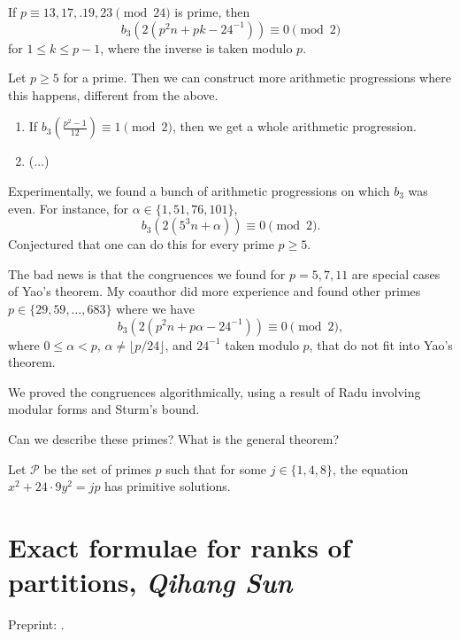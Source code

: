 \documentclass[reqno]{amsart} 
\begin{document}
\begin{theorem}
  If $p \equiv 13, 17,. 19, 23 \pmod{24}$ is prime, then
  \begin{equation*}
    b_3 \left( 2(p^2 n +  pk - 24^{-1}) \right) \equiv 0 \pmod{2}
  \end{equation*}
  for $1 \leq k \leq p - 1$, where the inverse is taken modulo $p$.
\end{theorem}
\begin{theorem}[Yao 2022]
  Let $p \geq 5$ for a prime.  Then we can construct more arithmetic progressions where this happens, different from the above.
  \begin{enumerate}
  \item If $b_3 \left( \frac{p^2 - 1}{12} \right) \equiv 1 \pmod{2}$, then we get a whole arithmetic progression.
  \item (...)
  \end{enumerate}
\end{theorem}

Experimentally, we found a bunch of arithmetic progressions on which $b_3$ was even.  For instance, for $\alpha \in \{1, 51, 76, 101\}$,
\begin{equation*}
  b_3 \left( 2(5^3 n + \alpha) \right) \equiv 0 \pmod{2}.
\end{equation*}
Conjectured that one can do this for every prime $p \geq 5$.

The bad news is that the congruences we found for $p = 5,7,11$ are special cases of Yao's theorem.  My coauthor did more experience and found other primes $p \in \{29, 59, \dotsc, 683\}$ where we have
\begin{equation*}
  b_3 \left( 2(p^2 n + p \alpha - 24^{-1}) \right) \equiv 0 \pmod{2},
\end{equation*}
where $0 \leq \alpha < p$, $\alpha \neq \lfloor p/24 \rfloor$, and $24^{-1}$ taken modulo $p$, that do not fit into Yao's theorem.

We proved the congruences algorithmically, using a result of Radu involving modular forms and Sturm's bound.

Can we describe these primes?  What is the general theorem?

Let $\mathcal{P}$ be the set of primes $p$ such that for some $j \in \{1, 4, 8\}$, the equation $x^2 + 24 \cdot 9 y^2 = j p$ has primitive solutions.


\section{Exact formulae for ranks of partitions, \textnormal{\emph{Qihang Sun}}}
Preprint: \cite{2024arXiv2406.06294}.
\end{document}
